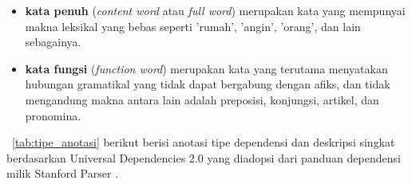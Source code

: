 \begin{itemize}
	\item \textbf{kata penuh} (\textit{content word} atau \textit{full word}) merupakan kata yang mempunyai makna leksikal yang bebas seperti 'rumah', 'angin', 'orang', dan lain sebagainya.
	\item \textbf{kata fungsi} (\textit{function word}) merupakan kata yang terutama menyatakan hubungan gramatikal yang tidak dapat bergabung dengan afiks, dan tidak mengandung makna antara lain adalah preposisi, konjungsi, artikel, dan pronomina.
\end{itemize}

 \tab~\ref{tab:tipe_anotasi} berikut berisi anotasi tipe dependensi dan deskripsi singkat berdasarkan Universal Dependencies 2.0 \citep{nivre2017universal} yang diadopsi dari panduan dependensi milik Stanford Parser \citep{de2008stanford}.

